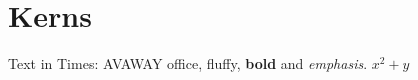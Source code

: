 \documentclass{article}
\begin{document}
\section{Kerns}
Text in Times: AVAWAY office, fluffy, \textbf{bold} and \emph{emphasis}. $x^2+y$
\end{document}
